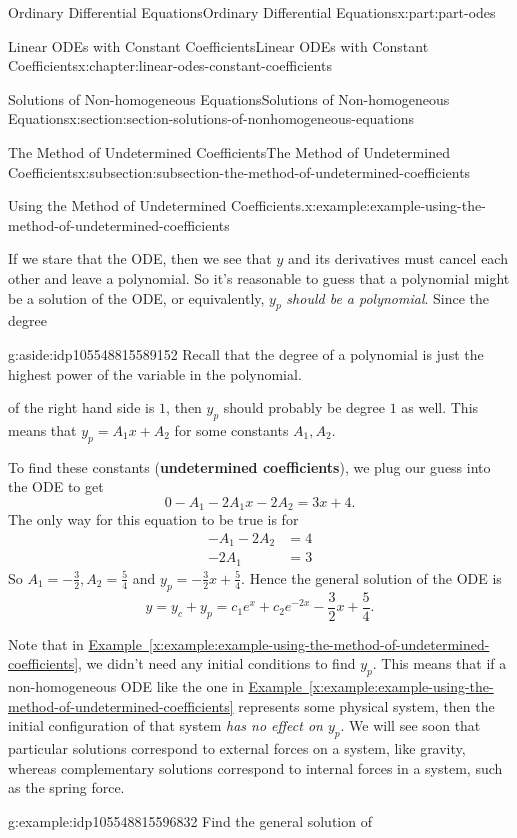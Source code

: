 \documentclass[twoside,10pt,]{book}
\newcommand{\xreffont}{\relax}
\newcommand{\terminology}[1]{\textbf{#1}}
\numberwithin{equation}{part}
\newcommand{\amp}{&}
\begin{document}
\begin{partptx}{Ordinary Differential Equations}{}{Ordinary Differential Equations}{}{}{x:part:part-odes}
\begin{chapterptx}{Linear ODEs with Constant Coefficients}{}{Linear ODEs with Constant Coefficients}{}{}{x:chapter:linear-odes-constant-coefficients}
\begin{sectionptx}{Solutions of Non-homogeneous Equations}{}{Solutions of Non-homogeneous Equations}{}{}{x:section:section-solutions-of-nonhomogeneous-equations}
\begin{subsectionptx}{The Method of Undetermined Coefficients}{}{The Method of Undetermined Coefficients}{}{}{x:subsection:subsection-the-method-of-undetermined-coefficients}
\begin{example}{Using the Method of Undetermined Coefficients.}{x:example:example-using-the-method-of-undetermined-coefficients}
\par
If we stare that the ODE, then we see that \(y\) and its derivatives must cancel each other and leave a polynomial. So it's reasonable to guess that a polynomial might be a solution of the ODE, or equivalently, \(y_{p}\) \emph{should be a polynomial}. Since the degree\begin{aside}{}{g:aside:idp105548815589152}%
Recall that the degree of a polynomial is just the highest power of the variable in the polynomial.%
\end{aside}
 of the right hand side is \(1\), then \(y_{p}\) should probably be degree \(1\) as well. This means that \(y_{p} = A_{1}x + A_{2}\) for some constants \(A_{1},A_{2}\).%
\par
To find these constants (\terminology{undetermined coefficients}), we plug our guess into the ODE to get%
\begin{equation*}
0 - A_{1} - 2A_{1}x - 2A_{2} = 3x + 4.
\end{equation*}
The only way for this equation to be true is for%
\begin{align*}
-A_{1} - 2A_{2} \amp = 4 \\
-2A_{1} \amp = 3
\end{align*}
So \(A_{1} = -\frac{3}{2}, A_{2} = \frac{5}{4}\) and \(y_{p} = -\frac{3}{2}x + \frac{5}{4}\). Hence the general solution of the ODE is%
\begin{equation*}
y = y_{c} + y_{p} = c_{1}e^{x} + c_{2}e^{-2x} - \frac{3}{2}x + \frac{5}{4}.
\end{equation*}
%
\end{example}
Note that in \hyperref[x:example:example-using-the-method-of-undetermined-coefficients]{Example~{\xreffont\ref{x:example:example-using-the-method-of-undetermined-coefficients}}}, we didn't need any initial conditions to find \(y_{p}\). This means that if a non-homogeneous ODE like the one in \hyperref[x:example:example-using-the-method-of-undetermined-coefficients]{Example~{\xreffont\ref{x:example:example-using-the-method-of-undetermined-coefficients}}} represents some physical system, then the initial configuration of that system \emph{has no effect on \(y_{p}\)}. We will see soon that particular solutions correspond to external forces on a system, like gravity, whereas complementary solutions correspond to internal forces in a system, such as the spring force.%
\begin{example}{}{g:example:idp105548815596832}%
Find the general solution of%

\end{example}
\end{subsectionptx}
\end{sectionptx}
\end{chapterptx}
\end{partptx}
\end{document}
